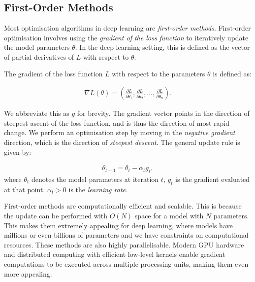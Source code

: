 
\subsection{First-Order Methods}

\label{ssec:first_order_methods}



Most optimisation algorithms in deep learning are \textit{first-order methods}. First-order optimisation involves using the \textit{gradient of the loss function} to iteratively update the model parameters $\theta$. In the deep learning setting, this is defined as the vector of partial derivatives of $L$ with respect to $\theta$.

\begin{definition}

    The gradient of the loss function $L$ with respect to the parameters $\theta$ is defined as:

    \begin{align}

        \nabla L(\theta) = \left(\frac{\partial L}{\partial \theta_1}, \frac{\partial L}{\partial \theta_2}, \ldots, \frac{\partial L}{\partial \theta_n}\right).

    \end{align}

\end{definition}



We abbreviate this as $g$ for brevity. The gradient vector points in the direction of steepest ascent of the loss function, and is thus the direction of most rapid change. We perform an optimisation step by moving in the \textit{negative gradient} direction, which is the direction of \textit{steepest descent}. The general update rule is given by:

\begin{align}
    \theta_{t+1} = \theta_t - \alpha_t g_t,
    \label{equation:first_order_update}
\end{align}
where $\theta_t$ denotes the model parameters at iteration $t$, $g_t$ is the gradient evaluated at that point. $\alpha_t > 0$ is the \textit{learning rate}. 



First-order methods are computationally efficient and scalable. This is because the update can be performed with $O(N)$ space for a model with $N$ parameters. This makes them extremely appealing for deep learning, where models have millions or even billions of parameters and we have constraints on computational resources. These methods are also highly parallelisable. Modern GPU hardware and distributed computing with efficient low-level kernels enable gradient computations to be executed across multiple processing units, making them even more appealing.



